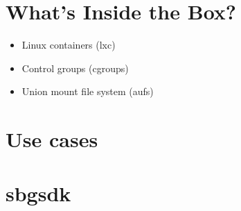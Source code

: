 \documentclass{beamer}
\begin{document}
  \section{What's Inside the Box?}
  \begin{frame}
    \begin{itemize}
    	\item Linux containers (lxc)
        \item Control groups (cgroups)
        \item Union mount file system (aufs)
    \end{itemize}
  \end{frame}
  
  \section{Use cases}
  \begin{frame}
    
  \end{frame}
  
  \section{sbgsdk}
  \begin{frame}
    
  \end{frame}
  
\end{document}
